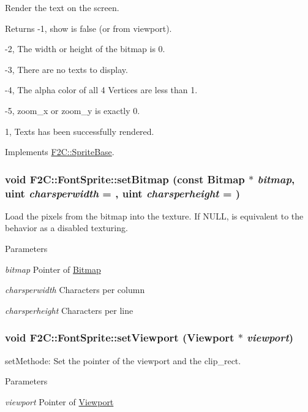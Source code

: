 Render the text on the screen. \begin{DoxyReturn}{Returns}
-\/1, show is false (or from viewport). 

-\/2, The width or height of the bitmap is 0. 

-\/3, There are no texts to display. 

-\/4, The alpha color of all 4 Vertices are less than 1. 

-\/5, zoom\_\-x or zoom\_\-y is exactly 0. 

1, Texts has been successfully rendered. 
\end{DoxyReturn}


Implements \hyperlink{class_f2_c_1_1_sprite_base_af9dfc70083ca5a774d3874b61a6f9abc}{F2C::SpriteBase}.\hypertarget{class_f2_c_1_1_font_sprite_a067445bcf9a95c276413091161066cb1}{
\subsubsection[{setBitmap}]{\setlength{\rightskip}{0pt plus 5cm}void F2C::FontSprite::setBitmap (const {\bf Bitmap} $\ast$ {\em bitmap}, \/  {\bf uint} {\em charsperwidth} = {}, \/  {\bf uint} {\em charsperheight} = {})}}
\label{class_f2_c_1_1_font_sprite_a067445bcf9a95c276413091161066cb1}


Load the pixels from the bitmap into the texture. If NULL, is equivalent to the behavior as a disabled texturing. 
\begin{DoxyParams}{Parameters}
\item[{\em bitmap}]Pointer of \hyperlink{class_f2_c_1_1_bitmap}{Bitmap} \item[{\em charsperwidth}]Characters per column \item[{\em charsperheight}]Characters per line  \end{DoxyParams}
\hypertarget{class_f2_c_1_1_font_sprite_ac6af1586ca99fd00365c1393f9a14817}{
\subsubsection[{setViewport}]{\setlength{\rightskip}{0pt plus 5cm}void F2C::FontSprite::setViewport ({\bf Viewport} $\ast$ {\em viewport})}}
\label{class_f2_c_1_1_font_sprite_ac6af1586ca99fd00365c1393f9a14817}


setMethode: Set the pointer of the viewport and the clip\_\-rect. 
\begin{DoxyParams}{Parameters}
\item[{\em viewport}]Pointer of \hyperlink{class_f2_c_1_1_viewport}{Viewport} \end{DoxyParams}
